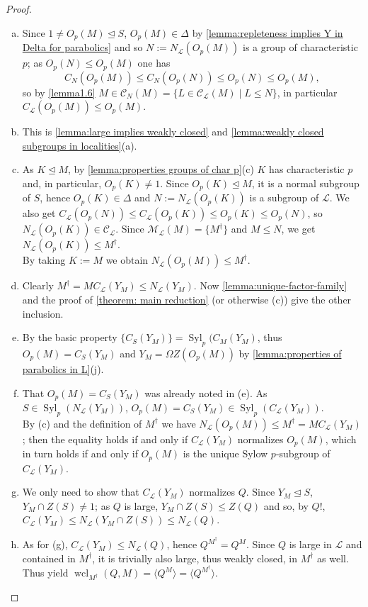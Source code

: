 \documentclass{amsart}
\numberwithin{equation}{section}
\theoremstyle{definition}
\theoremstyle{subresult}
\theoremstyle{caseresult}
\newcommand{\M}{\mathcal{M}}
\renewcommand{\L}{\mathcal{L}}
\newcommand{\C}{\mathcal{C}}
\newcommand{\Syl}{\operatorname{Syl}}
\newcommand{\wcl}{\operatorname{wcl}}
\newcommand{\norm}{\trianglelefteq}
\newcommand{\<}{\langle}
\renewcommand{\>}{\rangle}
\begin{document}
\begin{proof}
	\begin{enumerate}[(a)]
		\item Since $1 \ne O_p(M) \norm S$, $O_p(M) \in \Delta$ by \ref{lemma:repleteness implies Y in Delta for parabolics} and so $N:=N_\L(O_p(M))$ is a group of characteristic $p$; as $O_p(N) \le O_p(M)$ one has 
		\[
		C_N(O_p(M)) \le C_N(O_p(N)) \le O_p(N) \le O_p(M),
		\]
		so by \ref{lemma1.6} $M \in \C_{N}(M) = \{L \in \C_\L(M) \mid L \le N \}$, in particular $C_\L(O_p(M)) \le O_p(M)$.
		\item This is \ref{lemma:large implies weakly closed} and \ref{lemma:weakly closed subgroups in localities}(a).
		\item As $K \norm M$, by \ref{lemma:properties groups of char p}(c) $K$ has characteristic $p$ and, in particular, $O_p(K) \ne 1$. Since $O_p(K) \norm M$, it is a normal subgroup of $S$, hence $O_p(K) \in \Delta$ and $N:=N_\L(O_p(K))$ is a subgroup of $\L$. We also get $C_\L(O_p(N)) \le C_\L(O_p(K)) \le O_p(K) \le O_p(N)$, so $N_\L(O_p(K)) \in \C_\L$. Since $\M_\L(M) = \{M^\dagger\}$ and $M \le N$, we get $N_\L(O_p(K)) \le M^\dagger$.\\
		By taking $K:=M$ we obtain $N_\L(O_p(M)) \le M^\dagger$.
		\item Clearly $M^\dagger = M C_\L(Y_M) \le N_\L(Y_M)$. Now \ref{lemma:unique-factor-family} and the proof of \ref{theorem: main reduction} (or otherwise (c)) give the other inclusion.
		\item By the basic property $\{C_S(Y_M)\} = \Syl_p(C_M(Y_M)$, thus $O_p(M) = C_S(Y_M)$ and $Y_M = \Omega Z(O_p(M))$ by \ref{lemma:properties of parabolics in L}(j).
		\item That $O_p(M) = C_S(Y_M)$ was already noted in (e). As $S \in \Syl_p(N_\L(Y_M))$, $O_p(M) =C_S(Y_M) \in \Syl_p(C_\L(Y_M))$.\\
		By (c) and the definition of $M^\dagger$ we have $N_\L(O_p(M)) \le M^\dagger = MC_\L(Y_M)$; then the equality holds if and only if $C_\L(Y_M)$ normalizes $O_p(M)$, which in turn holds if and only if $O_p(M)$ is the unique Sylow $p$-subgroup of $C_\L(Y_M)$.
		\item We only need to show that $C_\L(Y_M)$ normalizes $Q$. Since $Y_M \norm S$, $Y_M \cap Z(S) \ne 1$; as $Q$ is large, $Y_M \cap Z(S) \le Z(Q)$ and so, by $Q!$, $C_\L(Y_M) \le N_\L(Y_M \cap Z(S)) \le N_\L(Q)$. 
		\item As for (g), $C_\L(Y_M) \le N_\L(Q)$, hence $Q^{M^\dagger} = Q^M$. Since $Q$ is large in $\L$ and contained in $M^\dagger$, it is trivially also large, thus weakly closed, in $M^\dagger$ as well. Thus \cite[Lemma 1.46(b) and (c)]{Meier-Stell-Stroth:2012} yield $\wcl_{M^\dagger}(Q,M) = \< Q^M \> = \<Q^{M^\dagger}\>$.
	\end{enumerate}
\end{proof}
\end{document}
